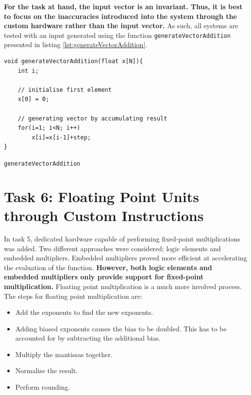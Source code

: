 \documentclass{article}
\begin{document}
\textbf{For the task at hand, the input vector is an invariant. Thus, it is best to focus on the inaccuracies introduced into the system through the custom hardware rather than the input vector.} As such, all systems are tested with an input generated using the function {\tt generateVectorAddition} presented in listing \ref{lst:generateVectorAddition}.

\begin{listing}[H]
\begin{verbatim}
void generateVectorAddition(float x[N]){
	int i;
	
	// initialise first element
	x[0] = 0;
	
	// generating vector by accumulating result
	for(i=1; i<N; i++)
		x[i]=x[i-1]+step;
}
\end{verbatim}
\caption{{\tt generateVectorAddition}} 
\label{lst:generateVectorAddition}
\end{listing}


\newpage
\section{Task 6: Floating Point Units through Custom Instructions}

In task 5, dedicated hardware capable of performing fixed-point multiplications was added. Two different approaches were considered; logic elements and embedded multipliers. Embedded multipliers proved more efficient at accelerating the evaluation of the function. \textbf{However, both logic elements and embedded multipliers only provide support for fixed-point multiplication.} Floating point multiplication is a much more involved process.\\ 

The steps for floating point multiplication are:
\begin{itemize}
    \item Add the exponents to find the new exponents. 
    \item Adding biased exponents causes the bias to be doubled. This has to be accounted for by subtracting the additional bias.
    \item Multiply the mantissas together.
    \item Normalise the result.
    \item Perform rounding.
\end{itemize}
\end{document}
